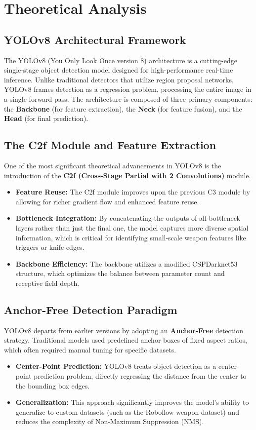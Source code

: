 \documentclass[12pt, a4paper]{report}
\begin{document}
\chapter{Theoretical Analysis}

\section{YOLOv8 Architectural Framework}
The YOLOv8 (You Only Look Once version 8) architecture is a cutting-edge single-stage object detection model designed for high-performance real-time inference. Unlike traditional detectors that utilize region proposal networks, YOLOv8 frames detection as a regression problem, processing the entire image in a single forward pass. The architecture is composed of three primary components: the \textbf{Backbone} (for feature extraction), the \textbf{Neck} (for feature fusion), and the \textbf{Head} (for final prediction).

\section{The C2f Module and Feature Extraction}
One of the most significant theoretical advancements in YOLOv8 is the introduction of the \textbf{C2f (Cross-Stage Partial with 2 Convolutions)} module. 
\begin{itemize}
    \item \textbf{Feature Reuse:} The C2f module improves upon the previous C3 module by allowing for richer gradient flow and enhanced feature reuse.
    \item \textbf{Bottleneck Integration:} By concatenating the outputs of all bottleneck layers rather than just the final one, the model captures more diverse spatial information, which is critical for identifying small-scale weapon features like triggers or knife edges.
    \item \textbf{Backbone Efficiency:} The backbone utilizes a modified CSPDarknet53 structure, which optimizes the balance between parameter count and receptive field depth.
\end{itemize}

\section{Anchor-Free Detection Paradigm}
YOLOv8 departs from earlier versions by adopting an \textbf{Anchor-Free} detection strategy. Traditional models used predefined anchor boxes of fixed aspect ratios, which often required manual tuning for specific datasets. 
\begin{itemize}
    \item \textbf{Center-Point Prediction:} YOLOv8 treats object detection as a center-point prediction problem, directly regressing the distance from the center to the bounding box edges.
    \item \textbf{Generalization:} This approach significantly improves the model's ability to generalize to custom datasets (such as the Roboflow weapon dataset) and reduces the complexity of Non-Maximum Suppression (NMS).
\end{itemize}
\end{document}
